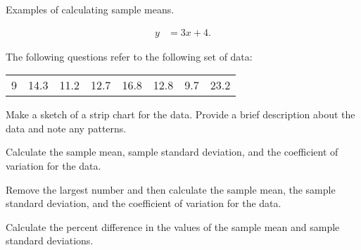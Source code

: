 

\begin{problem}
\item Examples of calculating sample means.

  \begin{subproblem}
  \item 
    \begin{eqnarray}
      y & = 3x + 4.
    \end{eqnarray}
    \vfill
  \end{subproblem}


\end{problem}




\begin{problem}

\item The following questions refer to the following set of data: \\
  \begin{tabular}{rrrrrrrr}
    9 & 14.3 & 11.2 & 12.7 & 16.8 & 12.8 & 9.7 & 23.2
  \end{tabular}

  \begin{subproblem}
  \item Make a sketch of a strip chart for the data. Provide a brief
    description about the data and note any patterns.

    \vspace{8em}


  \item Calculate the sample mean, sample standard deviation, and the
    coefficient of variation for the data.

    \vfill

  \item Remove the largest number and then calculate the sample mean,
    the sample standard deviation, and the coefficient of variation
    for the data.

    \vfill

  \item Calculate the percent difference in the values of the sample
    mean and sample standard deviations.

    \vspace{4em}

  \end{subproblem}

  \clearpage


\end{problem}
